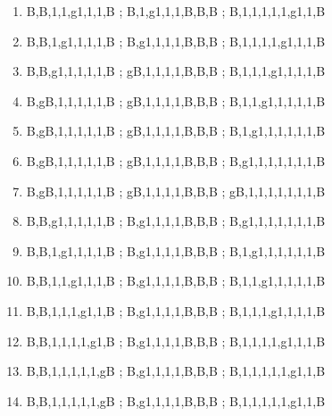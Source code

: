 \documentclass[leqno]{article}
\begin{document}
\begin{enumerate}
                    \item {}     {B,B,1,1,g1,1,1,B ; B,1,g1,1,1,B,B,B ; B,1,1,1,1,1,g1,1,B}
                    \item {}     {B,B,1,g1,1,1,1,B ; B,g1,1,1,1,B,B,B ; B,1,1,1,1,g1,1,1,B}
                    \item {}    {B,B,g1,1,1,1,1,B ; gB,1,1,1,1,B,B,B ; B,1,1,1,g1,1,1,1,B}
                    \item {}   {B,gB,1,1,1,1,1,B ; gB,1,1,1,1,B,B,B ; B,1,1,g1,1,1,1,1,B}
                    \item {}   {B,gB,1,1,1,1,1,B ; gB,1,1,1,1,B,B,B ; B,1,g1,1,1,1,1,1,B}
                    \item {}   {B,gB,1,1,1,1,1,B ; gB,1,1,1,1,B,B,B ; B,g1,1,1,1,1,1,1,B}
                    \item {}  {B,gB,1,1,1,1,1,B ; gB,1,1,1,1,B,B,B ; gB,1,1,1,1,1,1,1,B}
                    \item {}     {B,B,g1,1,1,1,1,B ; B,g1,1,1,1,B,B,B ; B,g1,1,1,1,1,1,1,B}
                    \item {}     {B,B,1,g1,1,1,1,B ; B,g1,1,1,1,B,B,B ; B,1,g1,1,1,1,1,1,B}
                    \item {}     {B,B,1,1,g1,1,1,B ; B,g1,1,1,1,B,B,B ; B,1,1,g1,1,1,1,1,B}
                    \item {}     {B,B,1,1,1,g1,1,B ; B,g1,1,1,1,B,B,B ; B,1,1,1,g1,1,1,1,B}
                    \item {}     {B,B,1,1,1,1,g1,B ; B,g1,1,1,1,B,B,B ; B,1,1,1,1,g1,1,1,B}
                    \item {}    {B,B,1,1,1,1,1,gB ; B,g1,1,1,1,B,B,B ; B,1,1,1,1,1,g1,1,B}
                    \item {}    {B,B,1,1,1,1,1,gB ; B,g1,1,1,1,B,B,B ; B,1,1,1,1,1,g1,1,B}
                \end{enumerate}
\end{document}
